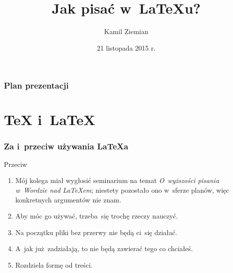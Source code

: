 \documentclass[10pt,t]{beamer}
\title{Jak pisać w~\LaTeX u?}
\author{Kamil Ziemian}
\date[21 XI 2015]{21 listopada 2015 r.}
\begin{document}






\RaggedRight





\maketitle %






\begin{frame}
  \frametitle{Plan prezentacji}


  \tableofcontents %

\end{frame}










\section{\TeX{} i~\LaTeX}



\begin{frame}
  \frametitle{Za i~przeciw używania \LaTeX a}


  Przeciw
  \begin{enumerate}
    \RaggedRight

  \item Mój kolega miał wygłosić seminarium na temat
    \textit{O~wyższości pisania w~Wordzie nad \LaTeX em}; niestety
    pozostało ono w~sferze planów, więc konkretnych argumentów nie
    znam.

  \item Aby móc go używać, trzeba~się trochę rzeczy nauczyć.

  \item Na początku pliki bez przerwy nie będą ci~się działać.

  \item A~jak już~zadziałają, to nie będą zawierać tego co chciałeś.

  \item Rozdziela formę od treści.

  \end{enumerate}

\end{frame}
\end{document}
